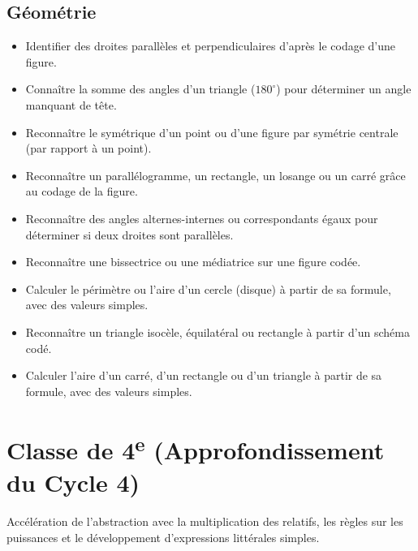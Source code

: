 \documentclass[11pt,a4paper]{article}
\begin{document}
\subsection*{Géométrie}
\begin{itemize}[label=,leftmargin=*]
    \item Identifier des droites parallèles et perpendiculaires d'après le codage d'une figure.
    \item Connaître la somme des angles d'un triangle ($180^\circ$) pour déterminer un angle manquant de tête.
    \item Reconnaître le symétrique d'un point ou d'une figure par symétrie centrale (par rapport à un point).
    \item Reconnaître un parallélogramme, un rectangle, un losange ou un carré grâce au codage de la figure.
    \item Reconnaître des angles alternes-internes ou correspondants égaux pour déterminer si deux droites sont parallèles.
    \item Reconnaître une bissectrice ou une médiatrice sur une figure codée.
    \item Calculer le périmètre ou l'aire d'un cercle (disque) à partir de sa formule, avec des valeurs simples.
    \item Reconnaître un triangle isocèle, équilatéral ou rectangle à partir d'un schéma codé.
    \item Calculer l'aire d'un carré, d'un rectangle ou d'un triangle à partir de sa formule, avec des valeurs simples.
\end{itemize}

\section{Classe de 4\textsuperscript{e} (Approfondissement du Cycle 4)}
Accélération de l'abstraction avec la multiplication des relatifs, les règles sur les puissances et le développement d'expressions littérales simples.
\end{document}
